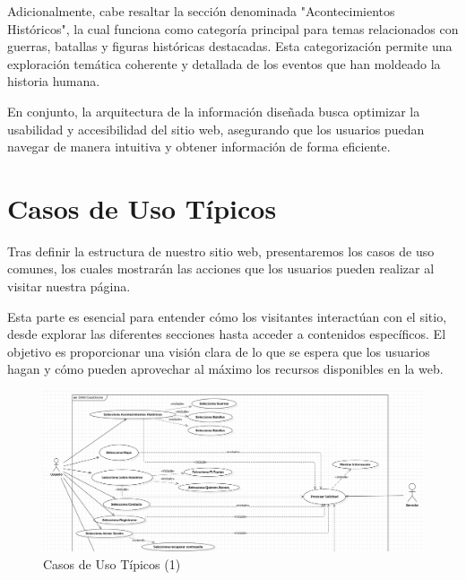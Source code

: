 \documentclass{article}
\begin{document}
Adicionalmente, cabe resaltar la sección denominada "Acontecimientos Históricos", la cual funciona como categoría principal para temas relacionados con guerras, batallas y figuras históricas destacadas. Esta categorización permite una exploración temática coherente y detallada de los eventos que han moldeado la historia humana.

En conjunto, la arquitectura de la información diseñada busca optimizar la usabilidad y accesibilidad del sitio web, asegurando que los usuarios puedan navegar de manera intuitiva y obtener información de forma eficiente.

\newpage

\section{Casos de Uso Típicos}

Tras definir la estructura de nuestro sitio web, presentaremos los casos de uso comunes, los cuales mostrarán las acciones que los usuarios pueden realizar al visitar nuestra página.

Esta parte es esencial para entender cómo los visitantes interactúan con el sitio, desde explorar las diferentes secciones hasta acceder a contenidos específicos. El objetivo es proporcionar una visión clara de lo que se espera que los usuarios hagan y cómo pueden aprovechar al máximo los recursos disponibles en la web.

\begin{figure}[H]
    \centering
    \includegraphics[width=1\textwidth]{Esquemas/CasosDeUsoSegmentado(1).jpg}
    \caption{Casos de Uso Típicos (1)}
    \label{fig:mi_imagen}
\end{figure}
\end{document}
